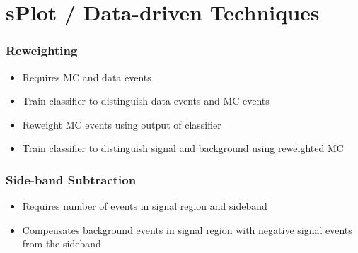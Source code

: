 \section[data]{sPlot / Data-driven Techniques}

\begin{frame}
    \frametitle{Reweighting}
    \begin{center}
        \begin{itemize}
            \item Requires MC and data events
            \item Train classifier to distinguish data events and MC events
            \item Reweight MC events using output of classifier
            \item Train classifier to distinguish signal and background using reweighted MC
        \end{itemize}
    \end{center}
\end{frame}

\begin{frame}
    \frametitle{Side-band Subtraction}
    \begin{center}
        \begin{itemize}
            \item Requires number of events in signal region and sideband
            \item Compensates background events in signal region with negative signal events from the sideband
        \end{itemize}
    \end{center}
\end{frame}

